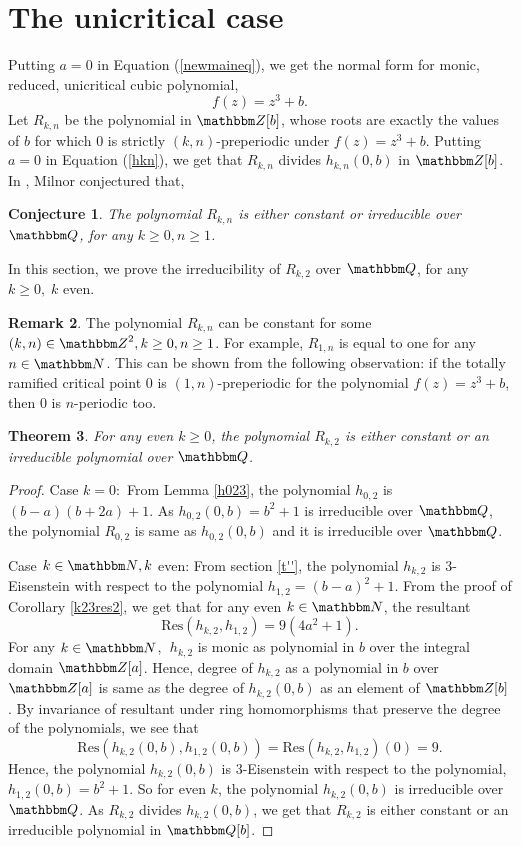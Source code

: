 \documentclass[reqno]{amsart}
\renewcommand{\eqref}[1]{(\ref{#1})}
\numberwithin{equation}{section}
\theoremstyle{plain}
\newtheorem{theorem}{Theorem}[section]
\newtheorem{conjecture}[theorem]{Conjecture}
\theoremstyle{definition}
\newtheorem{remark}[theorem]{Remark}
\theoremstyle{definition}
\newcommand{\Q}{{\mathbbm Q}}
\newcommand{\Z}{{\mathbbm Z}}
\newcommand{\N}{{\mathbbm N}}
\begin{document}
\section{The unicritical case}\label{unicritical}
    Putting $a=0$ in Equation \eqref{newmaineq}, we get the normal form for monic, reduced, unicritical cubic polynomial, $$f(z)= z^{3} +b.$$ Let $R_{k,n}$ be the polynomial in $\Z[b]$, whose roots are exactly the values of $b$ for which $0$ is strictly $(k,n)$-preperiodic under $f(z)= z^{3}+b$. Putting $a=0$ in Equation \eqref{hkn}, we get that $R_{k,n}$ divides $h_{k,n}(0,b)$ in $\Z[b]$. In \cite{Milnor+2014+15+24}, Milnor conjectured that,
    \begin{conjecture}
        The polynomial $R_{k,n}$ is either constant or irreducible over $\Q$, for any $k\geq 0, n\geq 1$.
    \end{conjecture}
    In this section, we prove the irreducibility of $R_{k,2}$ over $\Q$, for any $k \geq 0,\; k$ even.
    \begin{remark}\label{coales}
        The polynomial $R_{k,n}$ can be constant for some $(k,n)\in \Z^{2}, k\geq 0, n\geq 1$. For example, $R_{1,n}$ is equal to one for any $n\in \N$. This can be shown from the following observation: if the totally ramified critical point $0$ is $(1,n)$-preperiodic for the polynomial $f(z)=z^{3} + b$, then $0$ is $n$-periodic too.
    \end{remark}
    \begin{theorem}\label{uni}
        For any even $k\geq 0$, the polynomial $R_{k,2}$ is either constant or an irreducible polynomial over $\Q$. 
    \end{theorem}
    \begin{proof}
         Case $k=0:$ From Lemma \ref{h023}, the polynomial $h_{0,2}$ is $(b-a)(b+2a)+1$. As $h_{0,2}(0,b)= b^{2}+1$ is irreducible over $\Q$, the polynomial $R_{0,2}$ is same as $h_{0,2}(0,b)$ and it is irreducible over $\Q$.
         
         Case $k\in \N, k$ even: From section \ref{t''}, the polynomial $h_{k,2}$ is $3$-Eisenstein with respect to the polynomial $h_{1,2}=(b-a)^{2}+1$. From the proof of Corollary \ref{k23res2}, we get that for any even $k\in \N$, the resultant $$\mbox{Res}(h_{k,2},h_{1,2})= 9(4a^{2}+1).$$ For any $k\in \N$, $\;h_{k,2}$ is monic as polynomial in $b$ over the integral domain $\Z[a]$. Hence, degree of $h_{k,2}$ as a polynomial in $b$ over $\Z[a]$ is same as the degree of $h_{k,2}(0,b)$ as an element of $\Z[b]$. By invariance of resultant under ring homomorphisms that preserve the degree of the polynomials, we see that $$\mbox{Res}(h_{k,2}(0,b), h_{1,2}(0,b))= \mbox{Res}(h_{k,2}, h_{1,2}) (0) =9.$$  Hence, the polynomial $h_{k,2}(0,b)$ is $3$-Eisenstein with respect to the polynomial, $h_{1,2}(0,b)= b^{2}+1$. So for even $k$, the polynomial $h_{k,2}(0,b)$ is irreducible over $\Q$. As $R_{k,2}$ divides $h_{k,2}(0,b)$, we get that $R_{k,2}$ is either constant or an irreducible polynomial in $\Q[b]$.
    \end{proof}
\end{document}
